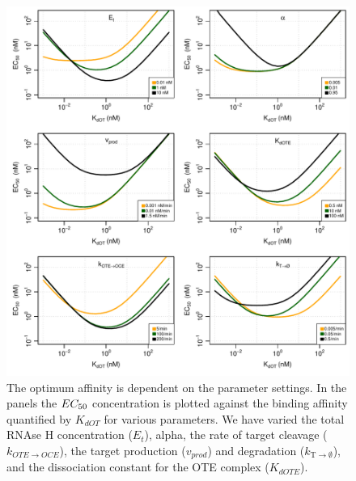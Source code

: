 \documentclass[a4paper,11pt]{article}
\newenvironment{Ncenter}{%
  \setlength\topsep{-10pt}
  \setlength\parskip{-100pt}
  \begin{center}
}{%
  \end{center}
}
\newcommand{\vd}{k_{\mathrm{T \to \emptyset}}}
\newcommand{\EC}{EC_{\rm{50}}}
\begin{document}
\begin{figure}[!h]
\begin{Ncenter}
\includegraphics[width=\textwidth]{SuppFile1-S2.pdf}
\end{Ncenter}
\caption{The optimum affinity is dependent on the parameter settings. In the panels the $\EC$ concentration is plotted against the binding affinity quantified by $K_{dOT}$ for various parameters. We have varied the total RNAse H concentration ($E_t$), alpha, the rate of target cleavage ($k_{OTE \to OCE}$), the target production ($v_{prod}$) and degradation ($\vd$), and the dissociation constant for the OTE complex ($K_{dOTE}$).}\label{fig::Opt}
\end{figure}


\end{document}
